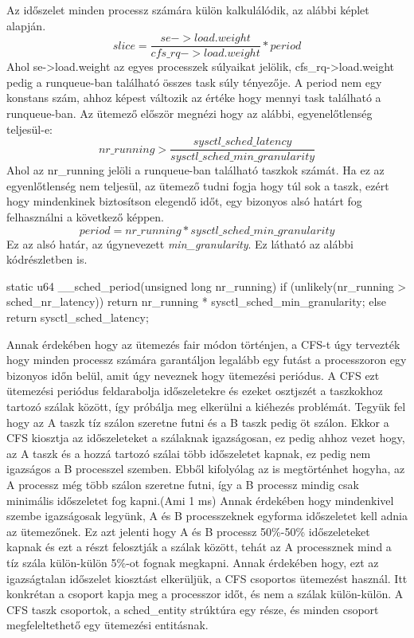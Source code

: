 Az időszelet minden processz számára külön kalkulálódik, az alábbi képlet alapján.
\begin{equation}
slice = \frac{se->load.weight}{cfs\_rq->load.weight}*period
\end{equation}
Ahol se->load.weight az egyes processzek súlyaikat jelölik, cfs\_rq->load.weight pedig a runqueue-ban található összes task súly tényezője. A period nem egy konstans szám, ahhoz képest változik az értéke hogy mennyi task található a runqueue-ban. 
Az ütemező először megnézi hogy az alábbi, egyenelőtlenség teljesül-e:
\begin{equation}
nr\_running > \frac{sysctl\_sched\_latency}{sysctl\_sched\_min\_granularity}
\end{equation}
Ahol az nr\_running jelöli a runqueue-ban található taszkok számát. Ha ez az egyenlőtlenség nem teljesül, az ütemező tudni fogja hogy túl sok a taszk, ezért hogy mindenkinek biztosítson elegendő időt, egy bizonyos alsó határt fog felhasználni a következő képpen.
\begin{equation}
period =  nr\_running * sysctl\_sched\_min\_granularity
\end{equation}
Ez az alsó határ, az úgynevezett \textit{min\_granularity}.
Ez látható az alábbi kódrészletben is.
\begin{cpp}
static u64 __sched_period(unsigned long nr_running)
{
	if (unlikely(nr_running > sched_nr_latency))
		return nr_running * sysctl_sched_min_granularity;
	else
		return sysctl_sched_latency;
}
\end{cpp}


Annak érdekében hogy az ütemezés fair módon történjen, a CFS-t úgy tervezték hogy minden processz számára garantáljon legalább egy futást a processzoron egy bizonyos időn belül, amit úgy neveznek hogy ütemezési periódus.
A CFS ezt ütemezési periódus feldarabolja időszeletekre és ezeket osztjszét a taszkokhoz tartozó szálak között, így próbálja meg elkerülni a kiéhezés problémát. 
Tegyük fel hogy az A taszk tíz szálon szeretne futni és a B taszk pedig öt szálon. Ekkor a CFS kiosztja az időszeleteket a szálaknak igazságosan, ez pedig ahhoz vezet hogy, az A taszk és a hozzá tartozó szálai több időszeletet kapnak, ez pedig nem igazságos a B processzel szemben.
Ebből kifolyólag az is megtörténhet hogyha, az A processz még több szálon szeretne futni, így a B processz mindig csak minimális időszeletet fog kapni.(Ami 1 ms) Annak érdekében hogy mindenkivel szembe igazságosak legyünk, A és B processzeknek egyforma időszeletet kell adnia az ütemezőnek. Ez azt jelenti hogy A és B processz 50\%-50\% időszeleteket kapnak és ezt a részt felosztják a szálak között, tehát az A processznek mind a tíz szála külön-külön 5\%-ot fognak megkapni.
Annak érdekében hogy, ezt az igazságtalan időszelet kiosztást elkerüljük, a CFS csoportos ütemezést használ. Itt konkrétan a csoport kapja meg a processzor időt, és nem a szálak külön-külön.
A CFS taszk csoportok, a sched\_entity strúktúra egy része, és minden csoport megfeleltethető egy ütemezési entitásnak.

